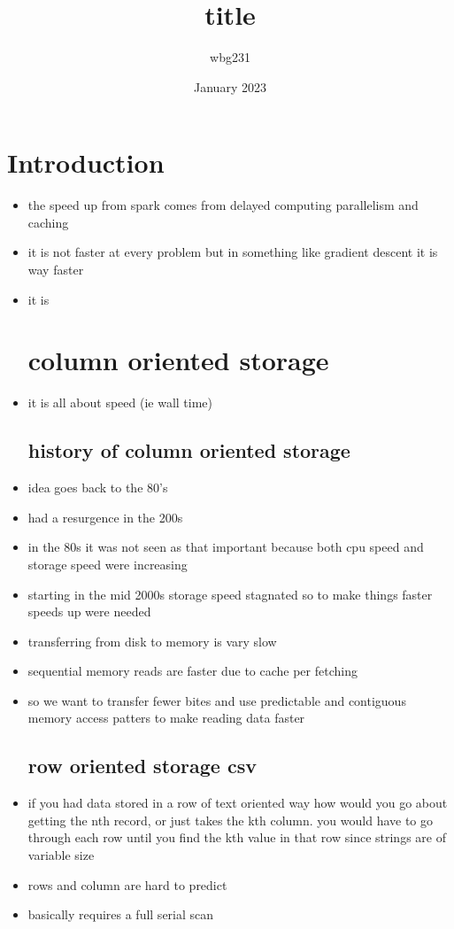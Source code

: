 \documentclass{article}
\title{title }
\author{wbg231 }
\date{January 2023}
\begin{document}
\maketitle

\section{Introduction}
\begin{itemize}
\item the speed up from spark comes from delayed computing parallelism and caching 
\item it is not faster at every problem but in something like gradient descent it is way faster 
\item it is
\section*{column oriented storage}
\item it is all about speed (ie wall time)
\subsection*{history of column oriented storage}
\item idea goes back to the 80's 
\item had a resurgence in the 200s 
\item in the 80s it was not seen as that important because both cpu speed and storage speed were increasing 
\item starting in the mid 2000s storage speed stagnated so to make things faster speeds up were needed
\item transferring from disk to memory is vary slow 
\item sequential memory reads are faster due to cache per fetching 
\item so we want to transfer fewer bites and use predictable and contiguous memory access patters to make reading data faster 
\subsection*{row oriented storage csv}
\item if you had data stored in a row of text oriented way how would you go about getting the nth record, or just takes the kth column. you would have to go through each row until you find the kth value in that row since strings are of variable size
\item rows and column are hard to predict 
\item basically requires a full serial scan

\end{itemize}
\end{document}
